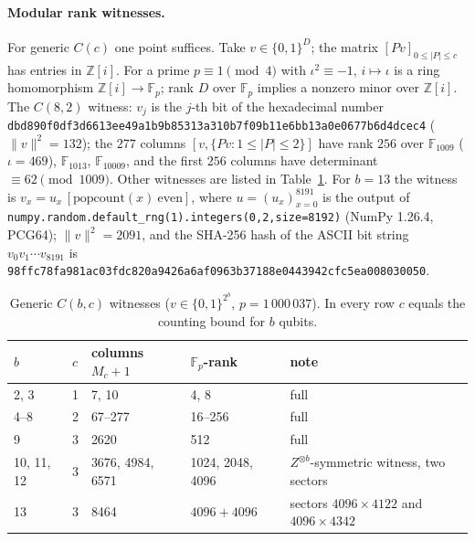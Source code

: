 \documentclass[aps,pra,onecolumn,superscriptaddress,nofootinbib,longbibliography,10pt]{revtex4-2}
\theoremstyle{definition}
\newcommand{\ZZ}{\mathbb Z}
\newcommand{\FF}{\mathbb F}
\begin{document}
\paragraph*{Modular rank witnesses.} For generic $C(c)$ one point suffices. Take $v\in\{0,1\}^D$; the matrix $[Pv]_{0\le|P|\le c}$ has entries in $\ZZ[i]$. For a prime $p\equiv1\pmod4$ with $\iota^2\equiv-1$, $i\mapsto\iota$ is a ring homomorphism $\ZZ[i]\to\FF_p$; rank $D$ over $\FF_p$ implies a nonzero minor over $\ZZ[i]$. The $C(8,2)$ witness: $v_j$ is the $j$-th bit of the hexadecimal number \texttt{dbd890f0df3d6613ee49a1b9b85313a3\allowbreak10b7f09b11e6bb13a0e0677b6d4dcec4} ($\|v\|^2=132$); the $277$ columns $[v,\{Pv:1\le|P|\le2\}]$ have rank $256$ over $\FF_{1009}$ ($\iota=469$), $\FF_{1013}$, $\FF_{10009}$, and the first $256$ columns have determinant $\equiv62\pmod{1009}$. Other witnesses are listed in Table~\ref{tab:fp}. For $b=13$ the witness is $v_x=u_x\,[\mathrm{popcount}(x)\ \text{even}]$, where $u=(u_x)_{x=0}^{8191}$ is the output of \texttt{numpy.random.default\_rng(1).integers(0,2,size=8192)} (NumPy 1.26.4, PCG64); $\|v\|^2=2091$, and the SHA-256 hash of the ASCII bit string $v_0v_1\cdots v_{8191}$ is \texttt{98ffc78fa981ac03\allowbreak fdc820a9426a6af0\allowbreak 963b37188e044394\allowbreak 2cfc5ea008030050}.

\begin{table}[h]
\caption{Generic $C(b,c)$ witnesses ($v\in\{0,1\}^{2^b}$, $p=1\,000\,037$). In every row $c$ equals the counting bound for $b$ qubits.}\label{tab:fp}
\begin{tabular}{lllll}
\toprule
$b$ & $c$ & columns $M_c+1$ & $\FF_p$-rank & note\\
\midrule
2, 3 & 1 & 7, 10 & 4, 8 & full\\
4--8 & 2 & 67--277 & 16--256 & full\\
9 & 3 & 2620 & 512 & full\\
10, 11, 12 & 3 & 3676, 4984, 6571 & 1024, 2048, 4096 & $Z^{\otimes b}$-symmetric witness, two sectors\\
13 & 3 & 8464 & $4096+4096$ & sectors $4096\times4122$ and $4096\times4342$\\
\bottomrule
\end{tabular}
\end{table}
\end{document}
